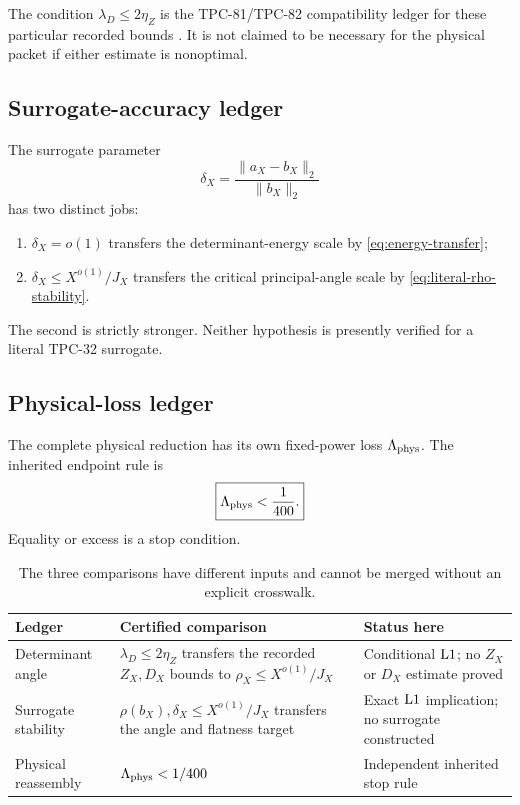 \begin{remark}
The condition \(\lambda_D\le2\eta_Z\) is the TPC-81/TPC-82
compatibility ledger for these particular recorded bounds
\citep{WangTPC81,WangTPC82}.  It is not claimed to be necessary for
the physical packet if either estimate is nonoptimal.
\end{remark}

\subsection{Surrogate-accuracy ledger}

The surrogate parameter
\[
 \delta_X=\frac{\|a_X-b_X\|_2}{\|b_X\|_2}
\]
has two distinct jobs:
\begin{enumerate}[label=(\alph*),leftmargin=2.2em]
\item \(\delta_X=o(1)\) transfers the determinant-energy scale by
\eqref{eq:energy-transfer};
\item \(\delta_X\le X^{o(1)}/J_X\) transfers the critical
principal-angle scale by
\eqref{eq:literal-rho-stability}.
\end{enumerate}
The second is strictly stronger.  Neither hypothesis is presently
verified for a literal TPC-32 surrogate.

\subsection{Physical-loss ledger}

The complete physical reduction has its own fixed-power loss
\(\Lambda_{\rm phys}\).  The inherited endpoint rule is
\begin{equation}
 \boxed{\Lambda_{\rm phys}<\frac1{400}.}
\label{eq:physical-loss-ledger}
\end{equation}
Equality or excess is a stop condition.

\begin{table}[ht]
\centering
\small
\begin{tabularx}{\textwidth}{@{}
  >{\raggedright\arraybackslash}p{}
  >{\raggedright\arraybackslash}X
  >{\raggedright\arraybackslash}p{}@{}}
\toprule
Ledger & Certified comparison & Status here\\
\midrule
Determinant angle
&
\(\lambda_D\le2\eta_Z\) transfers the recorded \(Z_X,D_X\)
bounds to \(\rho_X\le X^{o(1)}/J_X\)
&
Conditional \(\mathrm{L1}\); no \(Z_X\) or \(D_X\) estimate proved
\\
\addlinespace
Surrogate stability
&
\(\rho(b_X),\delta_X\le X^{o(1)}/J_X\) transfers the angle and
flatness target
&
Exact \(\mathrm{L1}\) implication; no surrogate constructed
\\
\addlinespace
Physical reassembly
&
\(\Lambda_{\rm phys}<1/400\)
&
Independent inherited stop rule
\\
\bottomrule
\end{tabularx}
\caption{The three comparisons have different inputs and cannot be
merged without an explicit crosswalk.}
\label{tab:separate-ledgers}
\end{table}

